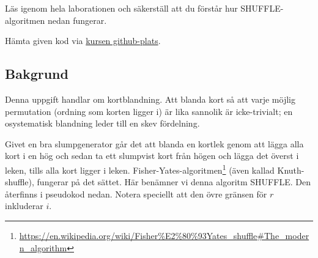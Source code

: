 

\Lab{\LabWeekSEVEN}

\begin{Goals}

\end{Goals}

\begin{Preparations}
\item {}
\item Läs igenom hela laborationen och säkerställ att du förstår hur SHUFFLE-algoritmen nedan fungerar.

\item Hämta given kod via \href{https://github.com/lunduniversity/introprog/tree/master/workspace/}{kursen github-plats}.

\end{Preparations}

\subsection{Bakgrund}\label{knuth-shuffle}

Denna uppgift handlar om kortblandning. Att blanda kort så att varje möjlig permutation (ordning som korten ligger i) är lika sannolik är icke-trivialt; en osystematisk blandning leder till en skev fördelning.

Givet en bra slumpgenerator går det att blanda en kortlek genom att lägga alla kort i en hög och sedan ta ett slumpvist kort från högen och lägga det överst i leken, tills alla kort ligger i leken. Fisher-Yates-algoritmen\footnote{\href{https://en.wikipedia.org/wiki/Fisher\%E2\%80\%93Yates_shuffle\#The_modern_algorithm}{https://en.wikipedia.org/wiki/Fisher\%E2\%80\%93Yates\_shuffle\#The\_modern\_algorithm}} (även kallad Knuth-shuffle), fungerar på det sättet. Här benämner vi denna algoritm SHUFFLE. Den återfinns i pseudokod nedan. Notera speciellt att den övre gränsen för $r$ inkluderar $i$.

\begin{algorithm}[H]
\end{algorithm}

